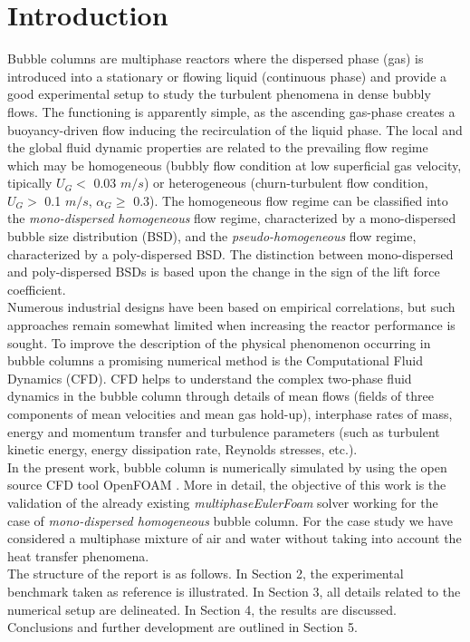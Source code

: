 \documentclass[11pt,a4paper]{article}
\begin{document}




\section{Introduction}
\label{sec:1}
Bubble columns are multiphase reactors where the dispersed phase (gas) is introduced into a stationary or flowing liquid (continuous phase) and provide a good experimental setup to study the turbulent phenomena in dense bubbly flows. The functioning is apparently simple, as the ascending gas-phase creates a buoyancy-driven flow inducing the recirculation of the liquid phase. The local and the global fluid dynamic properties are related to the prevailing flow regime which may be homogeneous (bubbly flow condition at low superficial gas velocity, tipically $U_G<$ 0.03 $m/s$) or heterogeneous (churn-turbulent flow condition, $U_G>$ 0.1 $m/s$, $\alpha_G \geq$ 0.3). The homogeneous flow regime can be classified into the \textit{mono-dispersed homogeneous} flow regime, characterized by a mono-dispersed bubble size distribution (BSD), and the \textit{pseudo-homogeneous} flow regime, characterized by a poly-dispersed BSD. The distinction between mono-dispersed and poly-dispersed BSDs is based upon the change in the sign of the lift force coefficient. \\
Numerous industrial designs have been based on empirical correlations, but such approaches remain somewhat limited when increasing the reactor performance is sought. To improve the description of the physical phenomenon occurring in bubble columns a promising numerical method is the Computational Fluid Dynamics (CFD). CFD helps to understand the complex two-phase fluid dynamics in the bubble column through details of mean flows (fields of three components of mean velocities and mean gas hold-up), interphase rates of mass, energy and momentum transfer and turbulence parameters (such as turbulent kinetic energy, energy dissipation rate, Reynolds stresses, etc.). \\
In the present work, bubble column is numerically simulated by using the open source CFD tool OpenFOAM \cite{OF}. More in detail, the objective of this work is the validation of the already existing \textit{multiphaseEulerFoam} solver working for the case of \textit{mono-dispersed homogeneous} bubble column. For the case study we have considered a multiphase mixture of air and water without taking into account the heat transfer phenomena. \\
The structure of the report is as follows. In Section 2, the experimental benchmark taken as reference is illustrated. In Section 3, all details related to the numerical setup are delineated. In Section 4, the results are discussed. Conclusions and further development are outlined in Section 5.
\end{document}
